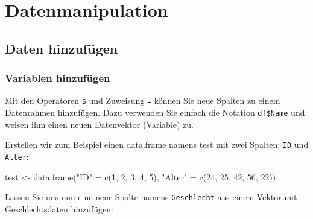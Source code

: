 \documentclass[
]{book}
\newenvironment{Shaded}{\begin{snugshade}}{\end{snugshade}}
\newcommand{\DecValTok}[1]{\textcolor[rgb]{0.00,0.00,0.81}{#1}}
\newcommand{\FunctionTok}[1]{\textcolor[rgb]{0.00,0.00,0.00}{#1}}
\newcommand{\NormalTok}[1]{#1}
\newcommand{\OtherTok}[1]{\textcolor[rgb]{0.56,0.35,0.01}{#1}}
\newcommand{\SpecialCharTok}[1]{\textcolor[rgb]{0.00,0.00,0.00}{#1}}
\newcommand{\StringTok}[1]{\textcolor[rgb]{0.31,0.60,0.02}{#1}}
\begin{document}
\hypertarget{datenmanipulation}{%
\chapter{Datenmanipulation}\label{datenmanipulation}}

\hypertarget{daten-hinzufuxfcgen}{%
\section{Daten hinzufügen}\label{daten-hinzufuxfcgen}}

\hypertarget{variablen-hinzufuxfcgen}{%
\subsection{Variablen hinzufügen}\label{variablen-hinzufuxfcgen}}

Mit den Operatoren \texttt{\$} und Zuweisung \texttt{=} können Sie neue Spalten zu einem Datenrahmen hinzufügen. Dazu verwenden Sie einfach die Notation \texttt{df\$Name} und weisen ihm einen neuen Datenvektor (Variable) zu.

Erstellen wir zum Beispiel einen data.frame namens test mit zwei Spalten: \texttt{ID} und \texttt{Alter}:

\begin{Shaded}
\begin{Highlighting}[]
\NormalTok{test }\OtherTok{\textless{}{-}} \FunctionTok{data.frame}\NormalTok{(}\StringTok{"ID"} \OtherTok{=} \FunctionTok{c}\NormalTok{(}\DecValTok{1}\NormalTok{, }\DecValTok{2}\NormalTok{, }\DecValTok{3}\NormalTok{, }\DecValTok{4}\NormalTok{, }\DecValTok{5}\NormalTok{),}
                     \StringTok{"Alter"} \OtherTok{=} \FunctionTok{c}\NormalTok{(}\DecValTok{24}\NormalTok{, }\DecValTok{25}\NormalTok{, }\DecValTok{42}\NormalTok{, }\DecValTok{56}\NormalTok{, }\DecValTok{22}\NormalTok{))}
\end{Highlighting}
\end{Shaded}

Lassen Sie uns nun eine neue Spalte namens \texttt{Geschlecht} aus einem Vektor mit Geschlechtsdaten hinzufügen:

\begin{Shaded}
\end{Shaded}
\end{document}
